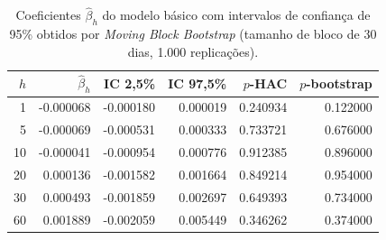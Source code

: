 \begin{table}[H]
\centering
\caption{Coeficientes $\hat{\beta}_h$ do modelo básico com intervalos de
confiança de 95\% obtidos por \textit{Moving Block Bootstrap}
(tamanho de bloco de 30 dias, 1.000 replicações).}
\label{tab:retlin-bootstrap}
\begin{tabular}{rrrrrr}
\toprule
$h$ & $\hat{\beta}_h$ & IC 2{,}5\% & IC 97{,}5\% & $p$-HAC & $p$-bootstrap \\
\midrule
      1 & -0.000068 & -0.000180 & 0.000019 & 0.240934 & 0.122000 \\
      5 & -0.000069 & -0.000531 & 0.000333 & 0.733721 & 0.676000 \\
     10 & -0.000041 & -0.000954 & 0.000776 & 0.912385 & 0.896000 \\
     20 & 0.000136 & -0.001582 & 0.001664 & 0.849214 & 0.954000 \\
     30 & 0.000493 & -0.001859 & 0.002697 & 0.649393 & 0.734000 \\
     60 & 0.001889 & -0.002059 & 0.005449 & 0.346262 & 0.374000 \\
\bottomrule
\end{tabular}
\end{table}
